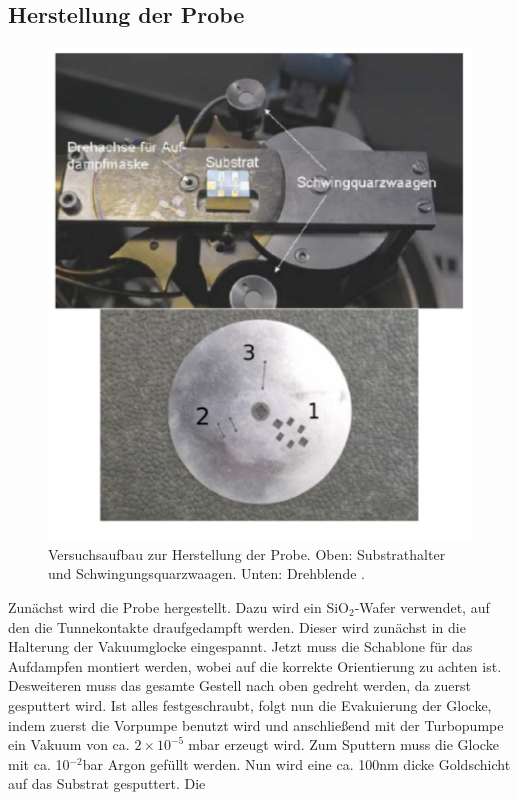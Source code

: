 \documentclass[twoside,        %
               BCOR12mm,       %
               english,ngerman, %
               fleqn,headsepline=false,footsepline=false
              ]{Vorlage/MFPREPORT}
\begin{document}
\subsection{Herstellung der Probe}
\begin{figure}[]
    \centering
    \includegraphics[scale=0.5]{fig/aufbau.png}
    \caption{Versuchsaufbau zur Herstellung der Probe. Oben: Substrathalter und
        Schwingungsquarzwaagen.
        Unten: Drehblende \cite{fprakt}.}
    \label{fig:aufbau}
\end{figure}
Zunächst wird die Probe hergestellt. Dazu wird ein SiO$_2$-Wafer verwendet,
auf den die Tunnekontakte draufgedampft werden. Dieser wird zunächst in die
Halterung der Vakuumglocke eingespannt. Jetzt muss die Schablone für das
Aufdampfen montiert werden, wobei auf die korrekte Orientierung zu achten ist.
Desweiteren muss das gesamte Gestell nach oben gedreht werden, da zuerst
gesputtert wird.
Ist alles festgeschraubt, folgt nun die Evakuierung der Glocke, indem zuerst
die Vorpumpe benutzt wird und anschließend mit der
Turbopumpe ein Vakuum von ca. $2\times10^{-5}\;$mbar erzeugt wird.
Zum Sputtern muss die Glocke mit ca. 10$^{-2}$\;bar Argon gefüllt werden.
Nun wird eine ca. 100\;nm dicke Goldschicht auf das Substrat gesputtert. Die
\end{document}
